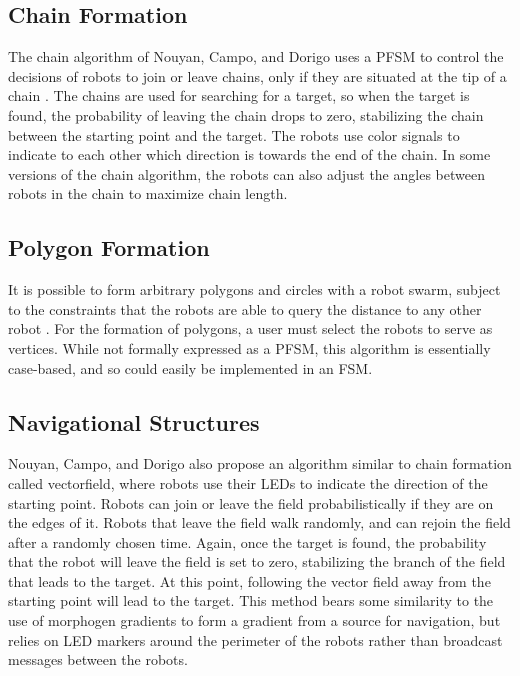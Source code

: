 \documentclass[]{article}
\begin{document}
\subsection{Chain Formation}

The chain algorithm of Nouyan, Campo, and Dorigo uses a PFSM to control the decisions of robots to join or leave chains, only if they are situated at the tip of a chain \cite{nouyan2008path}. 
The chains are used for searching for a target, so when the target is found, the probability of leaving the chain drops to zero, stabilizing the chain between the starting point and the target. 
The robots use color signals to indicate to each other which direction is towards the end of the chain. 
In some versions of the chain algorithm, the robots can also adjust the angles between robots in the chain to maximize chain length. 

\subsection{Polygon Formation}

It is possible to form arbitrary polygons and circles with a robot swarm, subject to the constraints that the robots are able to query the distance to any other robot \cite{sugihara1996distributed}.
For the formation of polygons, a user must select the robots to serve as vertices. 
While not formally expressed as a PFSM, this algorithm is essentially case-based, and so could easily be implemented in an FSM. 

\subsection{Navigational Structures}

Nouyan, Campo, and Dorigo also propose an algorithm similar to chain formation called vectorfield, where robots use their LEDs to indicate the direction of the starting point.
Robots can join or leave the field probabilistically if they are on the edges of it. 
Robots that leave the field walk randomly, and can rejoin the field after a randomly chosen time.
Again, once the target is found, the probability that the robot will leave the field is set to zero, stabilizing the branch of the field that leads to the target. 
At this point, following the vector field away from the starting point will lead to the target. 
This method bears some similarity to the use of morphogen gradients to form a gradient from a source for navigation, but relies on LED markers around the perimeter of the robots rather than broadcast messages between the robots. 
\end{document}
